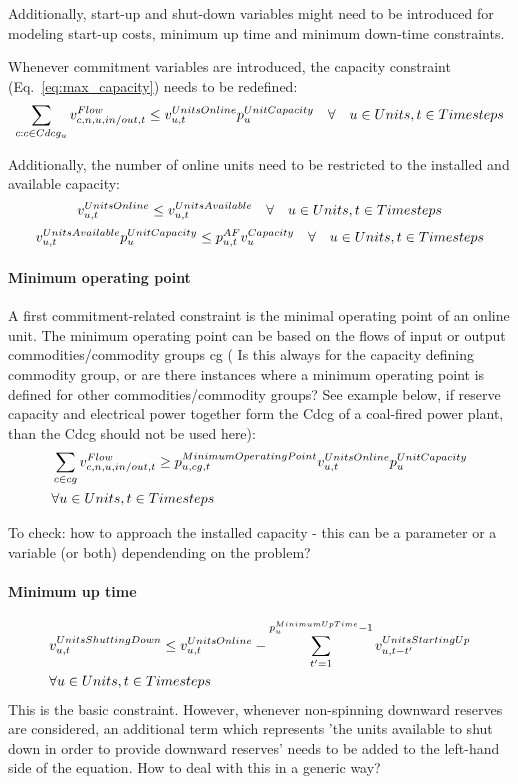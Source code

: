 Additionally, start-up and shut-down variables might need to be introduced for modeling start-up costs, minimum up time and minimum down-time constraints.

Whenever commitment variables are introduced, the capacity constraint (Eq.~\eqref{eq:max_capacity}) needs to be redefined:
\begin{equation} \label{eq:maximumoperatingpoint}
\sum_{\commodity : \commodity \in Cdcg_{\unit}} \vFlow \le \vUnitsOnline \pUnitCapacity \quad \forall \quad \units, \timesteps
\end{equation}

Additionally, the number of online units need to be restricted to the installed and available capacity:
\begin{equation} \label{eq:maximumonlineunits}
\vUnitsOnline \le \vUnitsAvailable \quad \forall \quad \units, \timesteps
\end{equation}
\begin{equation} \label{eq:availableunits}
\vUnitsAvailable \pUnitCapacity \le \pAF \vCapacity \quad \forall \quad \units, \timesteps
\end{equation}

\paragraph{Minimum operating point}
A first commitment-related constraint is the minimal operating point of an online unit. The minimum operating point can be based on the flows of input or output commodities/commodity groups cg ({\color{red}
Is this always for the capacity defining commodity group, or are there instances where a minimum operating point is defined for other commodities/commodity groups?} See example below, if reserve capacity and electrical power together form the Cdcg of a coal-fired power plant, than the Cdcg should not be used here):
\begin{align} \label{eq:minimumoperatingpoint}
&\sum_{\commodity \in cg} \vFlow \ge \pMinimumOperatingPoint \vUnitsOnline \pUnitCapacity \nonumber \\
& \forall \units, \timesteps
\end{align}

{\color{red} To check: how to approach the installed capacity - this can be a parameter or a variable (or both) dependending on the problem?}


\paragraph{Minimum up time}
\begin{align} \label{eq:minimumuptime}
&\vUnitsShuttingDown \le \vUnitsOnline - \sum_{\timestep'=1}^{\pMinimumUpTime - 1} \vUnitsStartingUp[\unit,\timestep-\timestep'] \nonumber \\
& \forall \units, \timesteps
\end{align}
{\color{red} This is the basic constraint. However, whenever non-spinning downward reserves are considered, an additional term which represents 'the units available to shut down in order to provide downward reserves' needs to be added to the left-hand side of the equation. How to deal with this in a generic way?}

